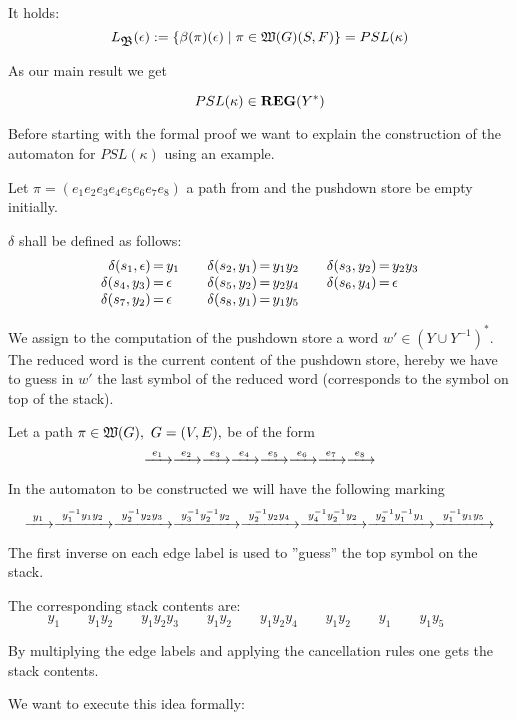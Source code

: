 It holds:
\[ L_{\mbox{$\mathfrak{B}$}}(\epsilon) := \mbox{$\{\beta(\pi)(\epsilon) \mid \pi
\in \mbox{$\mathfrak{W}({G})$}(S, F)\}$} = PSL(\kappa)
\]

\bigskip
As our main result we get
\begin{theorem}
\[ PSL(\kappa) \in \mbox{{\bf REG}}(Y^*) \]
\end{theorem}

Before starting with the formal proof we want to explain the construction of the
automaton for $PSL(\kappa)$ using an example.

Let $\pi = (e_1 e_2 e_3 e_4 e_5 e_6 e_7 e_8)$ a path from  and the
pushdown store be empty initially.

$\delta$ shall be defined as follows:
\[\begin{array}{r@{\,=\,}l@{\qquad}r@{\,=\,}l@{\qquad}r@{\,=\,}l}
\delta(s_1,\epsilon)&y_1 & \delta(s_2,y_1)&y_1y_2 & \delta(s_3,y_2)&y_2y_3 \\
\delta(s_4,y_3)&\epsilon & \delta(s_5,y_2)&y_2y_4 & \delta(s_6,y_4)&\epsilon \\
\delta(s_7,y_2)&\epsilon & \delta(s_8,y_1)&y_1y_5
\end{array}\]

We assign to the computation of the pushdown store a word $w' \in (Y\cup
Y^{-1})^*$. The reduced word is the current content of the pushdown store,
hereby we have to guess in $w'$ the last symbol of the reduced word
(corresponds to the symbol on top of the stack).

Let a path $\pi \in \pathcat{G},\ G=(V,E),$ be of the form
\[ \xrightarrow{\ {e_1}\ } \xrightarrow{\ {e_2}\ } \xrightarrow{\ {e_3}\ } \xrightarrow{\ {e_4}\ } \xrightarrow{\ {e_5}\ } \xrightarrow{\ {e_6}\ } \xrightarrow{\ {e_7}\ }
\xrightarrow{\ {e_8}\ } \]

In the automaton to be constructed we will have the following marking
\[ \xrightarrow{\ {y_1}\ } \xrightarrow{\ {y_1^{-1} y_1 y_2}\ } \xrightarrow{\ {y_2^{-1} y_2 y_3}\ } \xrightarrow{\ {y_3^{-1}
y_2^{-1} y_2}\ } \xrightarrow{\ {y_2^{-1} y_2 y_4}\ } \xrightarrow{\ {y_4^{-1} y_2^{-1} y_2}\ }
\xrightarrow{\ {y_2^{-1} y_1^{-1} y_1}\ } \xrightarrow{\ {y_1^{-1} y_1 y_5}\ }
\]

The first inverse on each edge label is used to ''guess'' the top symbol on
the stack.

The corresponding stack contents are:
\[ y_1 \qquad y_1 y_2 \qquad y_1 y_2 y_3 \qquad y_1 y_2 \qquad y_1 y_2 y_4
\qquad y_1 y_2 \qquad y_1 \qquad y_1 y_5 \qquad \]

By multiplying the edge labels and applying the cancellation rules one gets the
stack contents.

We want to execute this idea formally:

